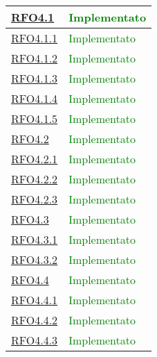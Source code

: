 \begin{longtable}{|>{\centering}m{5cm}|m{5cm}<{\centering}|}
\hyperlink{RFO4.1}{RFO4.1} & \textcolor{green}{Implementato}\\ \hline

\hyperlink{RFO4.1.1}{RFO4.1.1} & \textcolor{green}{Implementato}\\ \hline

\hyperlink{RFO4.1.2}{RFO4.1.2} &  \textcolor{green}{Implementato}\\ \hline

\hyperlink{RFO4.1.3}{RFO4.1.3} & \textcolor{green}{Implementato}\\ \hline

\hyperlink{RFO4.1.4}{RFO4.1.4} & \textcolor{green}{Implementato}\\ \hline

\hyperlink{RFO4.1.5}{RFO4.1.5} & \textcolor{green}{Implementato}\\ \hline

\hyperlink{RFO4.2}{RFO4.2} & \textcolor{green}{Implementato}\\ \hline

\hyperlink{RFO4.2.1}{RFO4.2.1} & \textcolor{green}{Implementato}\\ \hline

\hyperlink{RFO4.2.2}{RFO4.2.2} &  \textcolor{green}{Implementato}\\ \hline

\hyperlink{RFO4.2.3}{RFO4.2.3} & \textcolor{green}{Implementato}\\ \hline

\hyperlink{RFO4.3}{RFO4.3} & \textcolor{green}{Implementato}\\ \hline

\hyperlink{RFO4.3.1}{RFO4.3.1} & \textcolor{green}{Implementato}\\ \hline

\hyperlink{RFO4.3.2}{RFO4.3.2} & \textcolor{green}{Implementato}\\ \hline

\hyperlink{RFO4.4}{RFO4.4} & \textcolor{green}{Implementato}\\ \hline

\hyperlink{RFO4.4.1}{RFO4.4.1} &  \textcolor{green}{Implementato}\\ \hline

\hyperlink{RFO4.4.2}{RFO4.4.2} &  \textcolor{green}{Implementato}\\ \hline

\hyperlink{RFO4.4.3}{RFO4.4.3} & \textcolor{green}{Implementato}\\ \hline


\end{longtable}
